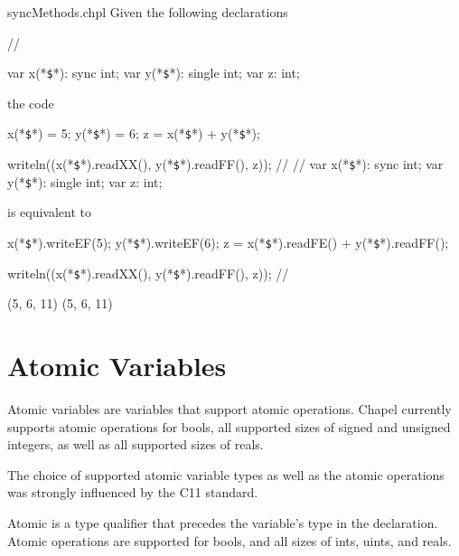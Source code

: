 \begin{chapelexample}{syncMethods.chpl}
Given the following declarations
\begin{chapelpre}
{ // }
\end{chapelpre}
\begin{chapel}
var x(*\texttt{\$}*): sync int;
var y(*\texttt{\$}*): single int;
var z: int;
\end{chapel}
the code
\begin{chapel}
x(*\texttt{\$}*) = 5;
y(*\texttt{\$}*) = 6;
z = x(*\texttt{\$}*) + y(*\texttt{\$}*);
\end{chapel}
\begin{chapelnoprint}
writeln((x(*\texttt{\$}*).readXX(), y(*\texttt{\$}*).readFF(), z));
// {
}
{ // }
var x(*\texttt{\$}*): sync int;
var y(*\texttt{\$}*): single int;
var z: int;
\end{chapelnoprint}
is equivalent to
\begin{chapel}
x(*\texttt{\$}*).writeEF(5);
y(*\texttt{\$}*).writeEF(6);
z = x(*\texttt{\$}*).readFE() + y(*\texttt{\$}*).readFF();
\end{chapel}
\begin{chapelpost}
writeln((x(*\texttt{\$}*).readXX(), y(*\texttt{\$}*).readFF(), z));
// {
}
\end{chapelpost}
\begin{chapeloutput}
(5, 6, 11)
(5, 6, 11)
\end{chapeloutput}
\end{chapelexample}



\section{Atomic Variables}
\label{Atomic_Variables}

Atomic variables are variables that support atomic operations. Chapel
currently supports atomic operations for bools, all supported sizes of
signed and unsigned integers, as well as all supported sizes of reals. 

\begin{rationale}
The choice of supported atomic variable types as well as the atomic
operations was strongly influenced by the C11 standard.
\end{rationale}

Atomic is a type qualifier that precedes the variable's type in
the declaration. Atomic operations are supported for bools, and all
sizes of ints, uints, and reals.  

